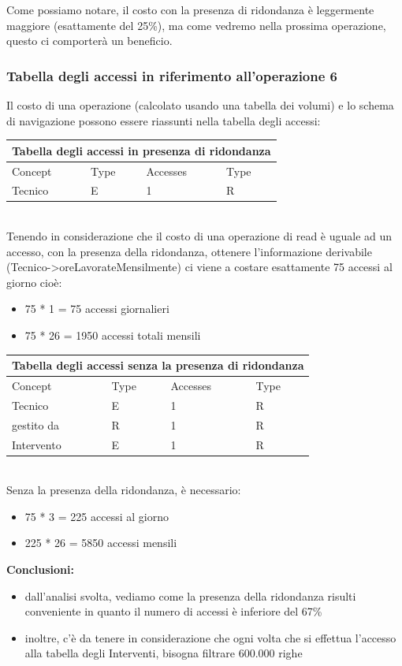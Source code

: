 \documentclass[legalpaper]{article}
\begin{document}
	Come possiamo notare, il costo con la presenza di ridondanza è leggermente maggiore (esattamente del 25\%), ma come vedremo nella prossima operazione, questo ci comporterà un beneficio.
	
	\subsubsection{Tabella degli accessi in riferimento all'operazione 6}
	Il costo di una operazione (calcolato usando una tabella dei volumi) e lo schema di navigazione possono essere riassunti nella tabella degli accessi: \\ 
	\newline
	\medskip
	\renewcommand\arraystretch{1,5}
	\begin{tabular}{|p{4cm}|p{4cm}|p{4cm}|p{4cm}|}
		\hline
		\multicolumn{4}{|c|}{\textbf{Tabella degli accessi in presenza di ridondanza}}\\
		\hline
		Concept & Type & Accesses & Type \\
		\hline
		Tecnico & E & 1 & R \\
		\hline
	\end{tabular}\\
	\newline
	Tenendo in considerazione che il costo di una operazione di read è uguale ad un accesso, con la presenza della ridondanza, ottenere l'informazione derivabile (Tecnico->oreLavorateMensilmente) ci viene a costare esattamente 75 accessi al giorno cioè:
	\begin{itemize}
		\item 75 * 1 = 75 accessi giornalieri
		\item 75 * 26 = 1950 accessi totali mensili
	\end{itemize}
	\begin{tabular}{|p{4cm}|p{4cm}|p{4cm}|p{4cm}|}
		\hline
		\multicolumn{4}{|c|}{\textbf{Tabella degli accessi senza la presenza di ridondanza}}\\
		\hline
		Concept & Type & Accesses & Type \\
		\hline
		Tecnico & E & 1 & R \\
		\hline
		gestito da & R & 1 & R \\ 
		\hline
		Intervento & E & 1 & R \\
		\hline
	\end{tabular} \\
	\newline
	Senza la presenza della ridondanza, è necessario:
	\begin{itemize}
		\item 75 * 3 = 225 accessi al giorno
		\item 225 * 26 = 5850 accessi mensili
	\end{itemize}
	\textbf{Conclusioni:}
	\begin{itemize}
		\item dall'analisi svolta, vediamo come la presenza della ridondanza risulti conveniente in quanto il numero di accessi è inferiore del 67\%
		\item inoltre, c'è da tenere in considerazione che ogni volta che si effettua l'accesso alla tabella degli Interventi, bisogna filtrare 600.000 righe
	\end{itemize}
	
\end{document}
